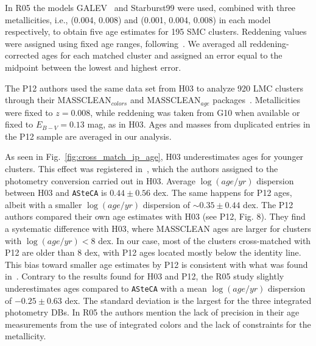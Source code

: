 \documentclass{aa}
\begin{document}
In R05 the models GALEV~\citep{Anders_2003} and Starburst99 were used, combined
with three metallicities, i.e., (0.004, 0.008) and (0.001, 0.004, 0.008) in each
model respectively, to obtain five age estimates for 195 SMC clusters. Reddening
values were assigned using fixed age ranges, following~\cite{Harris_2004}.
%
We averaged all reddening-corrected ages for each matched cluster
and assigned an error equal to the midpoint between the lowest and
highest error.

The P12 authors used the same data set from H03 to analyze 920 LMC clusters
through their MASSCLEAN$_{colors}$ and MASSCLEAN$_{age}$
packages~\citep{Popescu_2010a,Popescu_2010b}. Metallicities were fixed to
$z{=}0.008$, while reddening was taken from G10 when available or fixed to
$E_{B-V}{=}0.13$ mag, as in H03. Ages and masses from duplicated entries in
the P12 sample are averaged in our analysis.


As seen in Fig.~\ref{fig:cross_match_ip_age}, H03 underestimates ages for
younger clusters. This effect was registered in~\citet[][see Fig. 1]
{de_Grijs_2006}, which the authors assigned to the photometry conversion carried out in
H03. Average $\log(age/yr)$ dispersion between H03 and \texttt{ASteCA}
is $0.44{\pm}0.56$ dex.
%
The same happens for P12 ages, albeit with a smaller $\log(age/yr)$ dispersion
of ${\sim}0.35{\pm}0.44$ dex. The P12 authors compared their own age estimates
with H03 (see P12, Fig. 8). They find a systematic difference with H03, where
MASSCLEAN ages are larger for clusters with $\log(age/yr){<}8$ dex. In our case,
most of the clusters cross-matched with P12 are older than 8 dex, with P12 ages
located mostly below the identity line. This bias toward smaller age estimates
by P12 is consistent with what was found in~\cite{Choudhury_2015}.
%
Contrary to the results found for H03 and P12, the R05 study slightly
underestimates ages compared to \texttt{ASteCA} with a mean $\log(age/yr)$
dispersion of $-0.25{\pm}0.63$ dex. The standard deviation is the largest for
the three integrated photometry DBs. In R05 the authors mention the lack of
precision in their age measurements from the use of integrated colors and
the lack of constraints for the metallicity.
\end{document}
